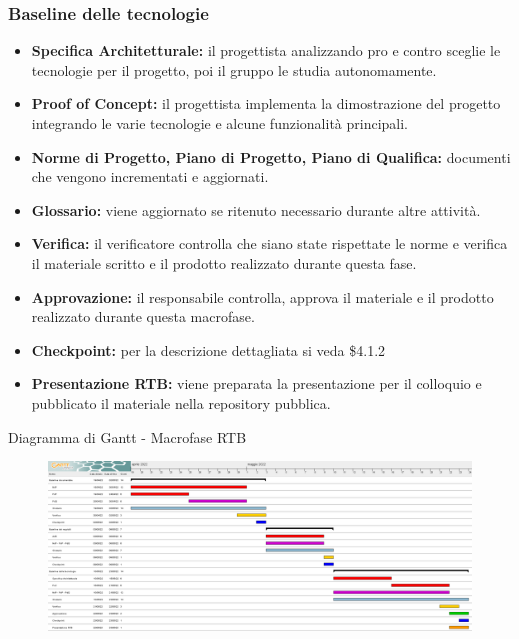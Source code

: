 \subsubsection{Baseline delle tecnologie}
\begin{itemize}
    \item \textbf{Specifica Architetturale:} il progettista analizzando pro e contro sceglie le tecnologie per il progetto, poi il gruppo le studia autonomamente.
    \item \textbf{Proof of Concept:} il progettista implementa la dimostrazione del progetto integrando le varie tecnologie e alcune funzionalità principali.
    \item \textbf{Norme di Progetto, Piano di Progetto, Piano di Qualifica:} documenti che vengono incrementati e aggiornati.
    \item \textbf{Glossario:} viene aggiornato se ritenuto necessario durante altre attività.
    \item \textbf{Verifica:} il verificatore controlla che siano state rispettate le norme e verifica il materiale scritto e il prodotto realizzato durante questa fase.
    \item \textbf{Approvazione:} il responsabile controlla, approva il materiale e il prodotto realizzato durante questa macrofase.
    \item \textbf{Checkpoint:} per la descrizione dettagliata si veda \$4.1.2
    \item \textbf{Presentazione RTB:} viene preparata la presentazione per il colloquio e pubblicato il materiale nella repository pubblica.
\end{itemize}


\begin{landscape}
    \begin{center}
        Diagramma di Gantt - Macrofase RTB
    \end{center}
	\begin{figure}
	\includegraphics[width=\linewidth]{images/RTB.png} 
	\end{figure}
\end{landscape}